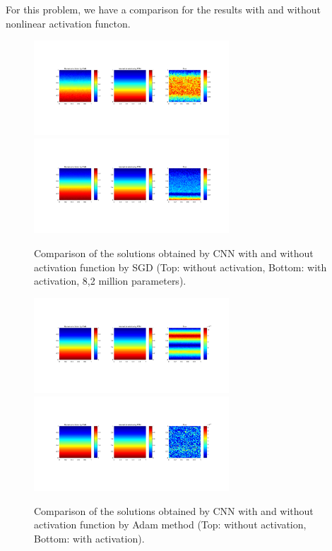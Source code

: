 For this problem, we have a comparison for the results with and without nonlinear activation functon.
\begin{figure}[H]
	\centering
	\includegraphics[width=0.65\textwidth]{figures/Darcy_CNN/Darcy_CNN_2000.png}
	\includegraphics[width=0.65\textwidth]{figures/Darcy_CNN/Darcy_CNN_2000_nonlinear.png}
	\caption{Comparison of the solutions obtained by CNN with and without activation function by SGD (Top: without activation, Bottom:  with activation, 8,2 million parameters).}
\end{figure}

\begin{figure}[!htbp]
	\centering
	\includegraphics[width=0.65\textwidth]{figures/Darcy_CNN/Darcy_CNN_Adam_2000.png}
	\includegraphics[width=0.65\textwidth]{figures/Darcy_CNN/Darcy_CNN_2000__Adam_nonlinear.png}
	\caption{Comparison of the solutions obtained by CNN with and without activation function by Adam method (Top: without activation, Bottom:  with activation).}
\end{figure}

